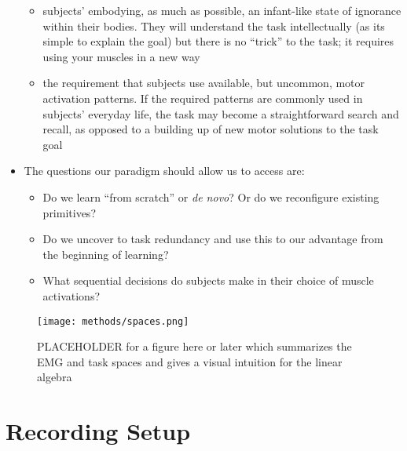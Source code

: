 \documentclass[../main.tex]{subfiles}
\begin{document}
\begin{itemize}
\begin{itemize}
    \item subjects' embodying, as much as possible, an infant-like state of ignorance within their bodies. They will understand the task intellectually (as its simple to explain the goal) but there is no ``trick'' to the task; it requires using your muscles in a new way
    \item the requirement that subjects use available, but uncommon, motor activation patterns. If the required patterns are commonly used in subjects' everyday life, the task may become a straightforward search and recall, as opposed to a building up of new motor solutions to the task goal
  \end{itemize}
  \item The questions our paradigm should allow us to access are:
  \begin{itemize}
    \item Do we learn ``from scratch'' or \textit{de novo}? Or do we reconfigure existing primitives?
    \item Do we uncover to task redundancy and use this to our advantage from the beginning of learning?
    \item What sequential decisions do subjects make in their choice of muscle activations?
  \end{itemize}
\end{itemize}


\begin{figure}[H]%
  \centering
  \texttt{[image: methods/spaces.png]}
  \caption[Geometry of the task]{PLACEHOLDER for a figure here or later which summarizes the EMG and task spaces and gives a visual intuition for the linear algebra}\label{fig:spaces}
\end{figure}


\section{Recording Setup}\label{sec:setup}
\end{document}
